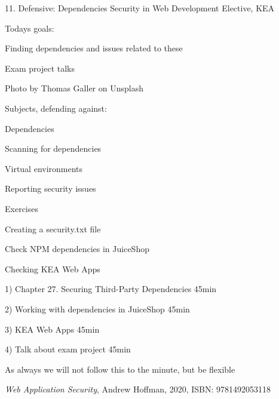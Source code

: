 \documentclass[Screen16to9,17pt]{foils}
\begin{document}
\mytitlepage
{11. Defensive: Dependencies}
{Security in Web Development Elective, KEA}




Todays goals:
\begin{list2}
\item Finding dependencies and issues related to these
\item Exam project talks
\end{list2}

Photo by Thomas Galler on Unsplash




\begin{list1}
\item Subjects, defending against:
\begin{list2}
\item Dependencies
\item Scanning for dependencies
\item Virtual environments
\item Reporting security issues
\end{list2}
\item Exercises
\begin{list2}
\item Creating a security.txt file
\item Check NPM dependencies in JuiceShop
\item Checking KEA Web Apps
\end{list2}
\end{list1}


\begin{list2}
\item 1) Chapter 27. Securing Third-Party Dependencies 45min
\item 2) Working with dependencies in JuiceShop 45min
\item 3) KEA Web Apps 45min
\item 4) Talk about exam project 45min
\end{list2}

As always we will not follow this to the minute, but be flexible


\emph{Web Application Security}, Andrew Hoffman, 2020, ISBN: 9781492053118
\end{document}
